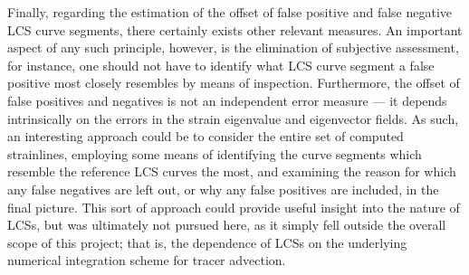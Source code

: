 Finally, regarding the estimation of the offset of false positive and false
negative LCS curve segments, there certainly exists other relevant measures.
An important aspect of any such principle, however, is the elimination of
subjective assessment, for instance, one should not have to identify
what LCS curve segment a false positive most closely resembles by means of
inspection. Furthermore, the offset of false positives and negatives is not
an independent error measure --- it depends intrinsically on the errors
in the strain eigenvalue and eigenvector fields. As such, an interesting
approach could be to consider the entire set of computed strainlines, employing
some means of identifying the curve segments which resemble the reference
LCS curves the most, and examining the reason for which any false negatives
are left out, or why any false positives are included, in the final picture.
This sort of approach could provide useful insight into the nature of LCSs, but
was ultimately not pursued here, as it simply fell outside the
overall scope of this project; that is, the dependence of LCSs on the
underlying numerical integration scheme for tracer advection.


